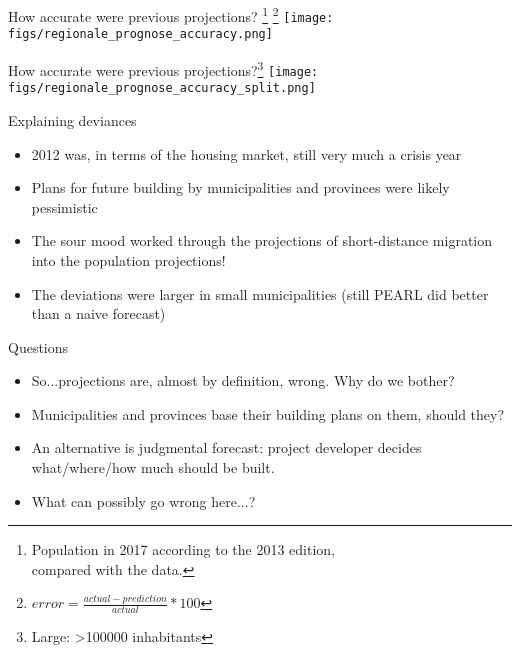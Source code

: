 \documentclass[final, 12pt, aspectratio=169, xcolor={dvipsnames}]{beamer}
\newcommand*{\figs}{../figs}%
\begin{document}
\begin{frame}{How accurate were previous projections? \footnote{\tiny Population in 2017 according to the 2013 edition, \\ compared with the data.} \footnote{\tiny $error = \frac{actual - prediction}{actual} * 100$}}
    \centering
    \texttt{[image: \\figs/regionale\_prognose\_accuracy.png]} 

\end{frame}

\begin{frame}{How accurate were previous projections?\footnote{\tiny Large: >100000 inhabitants}}
  \centering
  \texttt{[image: \\figs/regionale\_prognose\_accuracy\_split.png]}

\end{frame}

\begin{frame}{Explaining deviances}  
  \begin{itemize}
  \item  2012 was, in terms of the housing market, still very much a crisis year
  \item Plans for future building by municipalities and provinces were likely pessimistic
  \item The sour mood worked through the projections of short-distance migration into the population projections!
    \item The deviations were larger in small municipalities (still PEARL did better than a naive forecast)
  \end{itemize}
  \href{http://www.pbl.nl/publicaties/evaluatie-pbl-cbs-regionale-bevolkings-en-huishoudensprognose}{}
\end{frame}

\begin{frame}{Questions}
  \begin{itemize}
  \item So...projections are, almost by definition, wrong. Why do we bother?
  \item Municipalities and provinces base their building plans on them, should they? \href{https://www.gebiedsontwikkeling.nu/artikelen/het-noord-hollandse-sprookje-van-vraaggestuurde-woningbouw/}{}
  \item An alternative is judgmental forecast: project developer decides what/where/how much should be built.
  \item What can possibly go wrong here...?
  \end{itemize}
  \end{frame}
\end{document}
